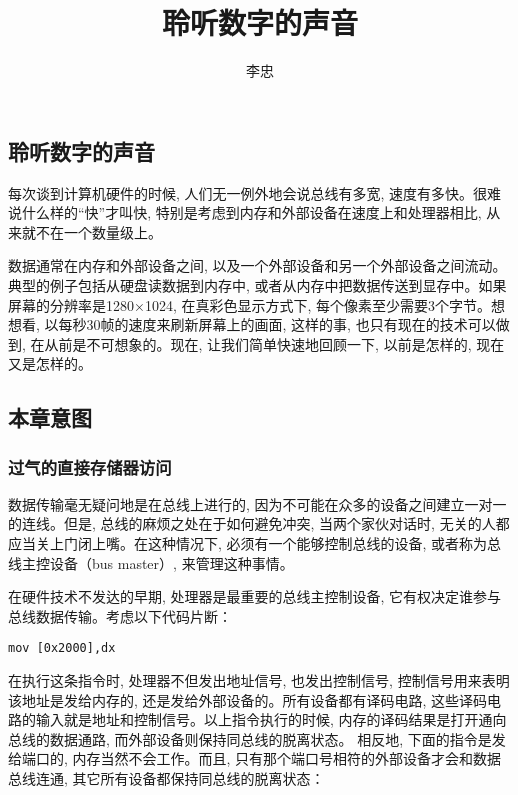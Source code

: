 \documentclass[12pt]{article}
\begin{document}
\begin{CJK}{UTF8}{gbsn} %

\title{聆听数字的声音}
\author{李忠}

\maketitle

\newpage
\tableofcontents
\newpage

\section{聆听数字的声音}
每次谈到计算机硬件的时候, 人们无一例外地会说总线有多宽, 速度有多快。很难说什么样的“快”才叫快, 特别是考虑到内存和外部设备在速度上和处理器相比, 从来就不在一个数量级上。

数据通常在内存和外部设备之间, 以及一个外部设备和另一个外部设备之间流动。典型的例子包括从硬盘读数据到内存中, 或者从内存中把数据传送到显存中。如果屏幕的分辨率是1280×1024, 在真彩色显示方式下, 每个像素至少需要3个字节。想想看, 以每秒30帧的速度来刷新屏幕上的画面, 这样的事, 也只有现在的技术可以做到, 在从前是不可想象的。现在, 让我们简单快速地回顾一下, 以前是怎样的, 现在又是怎样的。

\subsection{本章意图}
\subsubsection{过气的直接存储器访问}
数据传输毫无疑问地是在总线上进行的, 因为不可能在众多的设备之间建立一对一的连线。但是, 总线的麻烦之处在于如何避免冲突, 当两个家伙对话时, 无关的人都应当关上门闭上嘴。在这种情况下, 必须有一个能够控制总线的设备, 或者称为总线主控设备（bus master）, 来管理这种事情。

在硬件技术不发达的早期, 处理器是最重要的总线主控制设备, 它有权决定谁参与总线数据传输。考虑以下代码片断：

\begin{verbatim}
mov [0x2000],dx
\end{verbatim}

在执行这条指令时, 处理器不但发出地址信号, 也发出控制信号, 控制信号用来表明该地址是发给内存的, 还是发给外部设备的。所有设备都有译码电路, 这些译码电路的输入就是地址和控制信号。以上指令执行的时候, 内存的译码结果是打开通向总线的数据通路, 而外部设备则保持同总线的脱离状态。
相反地, 下面的指令是发给端口的, 内存当然不会工作。而且, 只有那个端口号相符的外部设备才会和数据总线连通, 其它所有设备都保持同总线的脱离状态：


\end{CJK}
\end{document}
